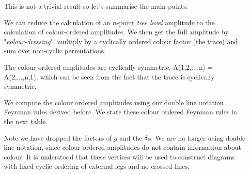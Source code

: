 This is not a trivial result so let's summarise the main points: 
\ben[label=(\roman*)] 
    \item We can reduce the calculation of an $n$-point \textit{tree level} amplitude to the calculation of colour-ordered amplitudes. We then get the full amplitude by "\textit{colour-dressing}": multiply by a cyclically ordered colour factor (the trace) and sum over non-cyclic permutations.
    \item The colour ordered amplitudes are cyclically symmetric,
    \bse 
        A(1,2,...,n) = A(2,...,n,1),
    \ese 
    which can be seen from the fact that the trace is cyclically symmetric. 
    \item We compute the colour ordered amplitudes using our double line notation Feynman rules derived before. We state these colour ordered Feynman rules in the next table.
\een 


Note we have dropped the factors of $g$ and the $\delta$s. We are no longer using double line notation, since colour ordered amplitudes do not contain information about colour. It is understood that these vertices will be used to construct diagrams with fixed cyclic ordering of external legs and no crossed lines. 